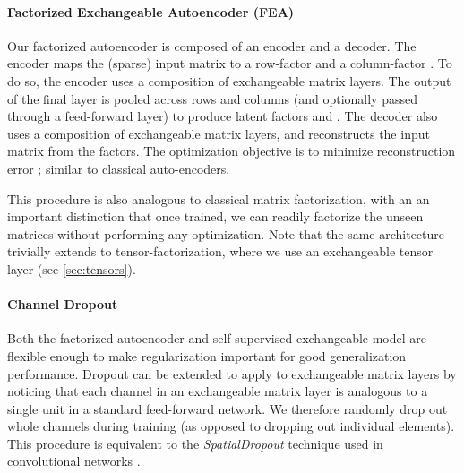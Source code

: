 \documentclass{article}
\theoremstyle{definition}
\begin{document}
\vspace{-.6em minus .3em}\paragraph{Factorized Exchangeable Autoencoder (FEA)}
Our factorized autoencoder is composed of an encoder and a decoder. 
The encoder  maps
the (sparse) input matrix  to a row-factor  and a column-factor . To do so, the encoder uses a composition of
exchangeable matrix layers. The output of the final layer  is pooled across rows and columns (and optionally passed through a feed-forward layer) to 
produce latent factors  and .
The decoder  also uses a composition of exchangeable matrix layers, and reconstructs the input matrix  from the factors. The optimization objective is to minimize reconstruction error
; similar to classical auto-encoders. 

This procedure is also analogous to classical matrix factorization, with an an important distinction that
once trained, we can readily factorize the unseen matrices without performing any optimization. Note that the same architecture trivially extends to tensor-factorization, where we use an exchangeable tensor layer (see \cref{sec:tensors}). 

\vspace{-.6em minus .3em}\paragraph{Channel Dropout}
Both the factorized autoencoder and self-supervised exchangeable model are flexible enough to make regularization important for good generalization performance. Dropout \citep{srivastava2014dropout} can be extended to apply to exchangeable matrix layers by noticing that each channel in an exchangeable matrix layer is analogous to a single unit in a standard feed-forward network. We therefore randomly drop out whole channels during training (as opposed to dropping out individual elements). This procedure is equivalent to the \emph{SpatialDropout} technique used in convolutional networks  \citep{tompson2015efficient}.
\end{document}
